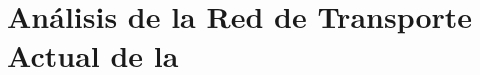 %
%
%
\chapter{Análisis de la Red de Transporte Actual de la \zmvm}
\label{ch:analisis-red-actual}







